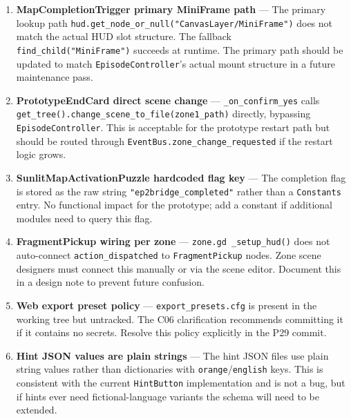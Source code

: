 \documentclass[12pt, a4paper]{article}
\begin{document}
\begin{enumerate}

  \item \textbf{MapCompletionTrigger primary MiniFrame path} — The primary
  lookup path \texttt{hud.get\_node\_or\_null("CanvasLayer/MiniFrame")}
  does not match the actual HUD slot structure. The fallback
  \texttt{find\_child("MiniFrame")} succeeds at runtime. The primary path
  should be updated to match \texttt{EpisodeController}'s actual mount
  structure in a future maintenance pass.

  \item \textbf{PrototypeEndCard direct scene change} — \texttt{\_on\_confirm\_yes}
  calls \texttt{get\_tree().change\_scene\_to\_file(zone1\_path)} directly,
  bypassing \texttt{EpisodeController}. This is acceptable for the prototype
  restart path but should be routed through \texttt{EventBus.zone\_change\_requested}
  if the restart logic grows.

  \item \textbf{SunlitMapActivationPuzzle hardcoded flag key} — The completion
  flag is stored as the raw string \texttt{"ep2bridge\_completed"} rather than
  a \texttt{Constants} entry. No functional impact for the prototype; add a
  constant if additional modules need to query this flag.

  \item \textbf{FragmentPickup wiring per zone} — \texttt{zone.gd~\_setup\_hud()}
  does not auto-connect \texttt{action\_dispatched} to \texttt{FragmentPickup}
  nodes. Zone scene designers must connect this manually or via the scene
  editor. Document this in a design note to prevent future confusion.

  \item \textbf{Web export preset policy} — \texttt{export\_presets.cfg} is
  present in the working tree but untracked. The C06 clarification recommends
  committing it if it contains no secrets. Resolve this policy explicitly in
  the P29 commit.

  \item \textbf{Hint JSON values are plain strings} — The hint JSON files use
  plain string values rather than dictionaries with \texttt{orange}/\texttt{english}
  keys. This is consistent with the current \texttt{HintButton} implementation
  and is not a bug, but if hints ever need fictional-language variants the
  schema will need to be extended.

\end{enumerate}
\end{document}
